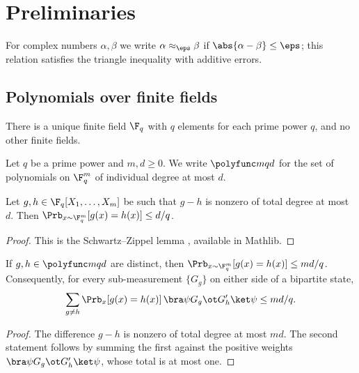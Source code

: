 \chapter{Preliminaries}
\label{chap:preliminaries}
\label{sec:prelims}

For complex numbers $\alpha,\beta$ we write $\alpha\approx_\eps\beta$ if
$\abs{\alpha-\beta}\le\eps$; this relation satisfies the triangle inequality
with additive errors.

\section{Polynomials over finite fields}

There is a unique finite field $\F_q$ with $q$ elements for each prime power
$q$, and no other finite fields.

\begin{definition}\label{def:polyfunc}
	\leanok
	Let $q$ be a prime power and $m,d\ge0$.  We write $\polyfunc mqd$ for the
	set of polynomials on $\F_q^m$ of individual degree at most $d$.
\end{definition}

\begin{lemma}\label{lem:schwartz-zippel-total-degree}
	\leanok
	Let $g,h\in\F_q[X_1,\ldots,X_m]$ be such that $g-h$ is nonzero of total
	degree at most $d$.  Then $\Prb_{x\sim\F_q^m}[g(x)=h(x)]\le d/q$.
\end{lemma}
\begin{proof}
	\leanok
	This is the Schwartz--Zippel lemma \cite{Sch80,Zip79}, available in
	Mathlib.
\end{proof}

\begin{corollary}\label{cor:schwartz-zippel-individual}
	\leanok
	If $g,h\in\polyfunc mqd$ are distinct, then
	$\Prb_{x\sim\F_q^m}[g(x)=h(x)]\le md/q$.  Consequently, for every
	sub-measurement $\{G_g\}$ on either side of a bipartite state,
	\[
		\sum_{g\ne h}\Prb_x[g(x)=h(x)]\,\bra\psi G_g\ot G'_h\ket\psi\le md/q.
	\]
\end{corollary}
\begin{proof}
	\leanok
	The difference $g-h$ is nonzero of total degree at most $md$.  The second
	statement follows by summing the first against the positive weights
	$\bra\psi G_g\ot G'_h\ket\psi$, whose total is at most one.
\end{proof}

